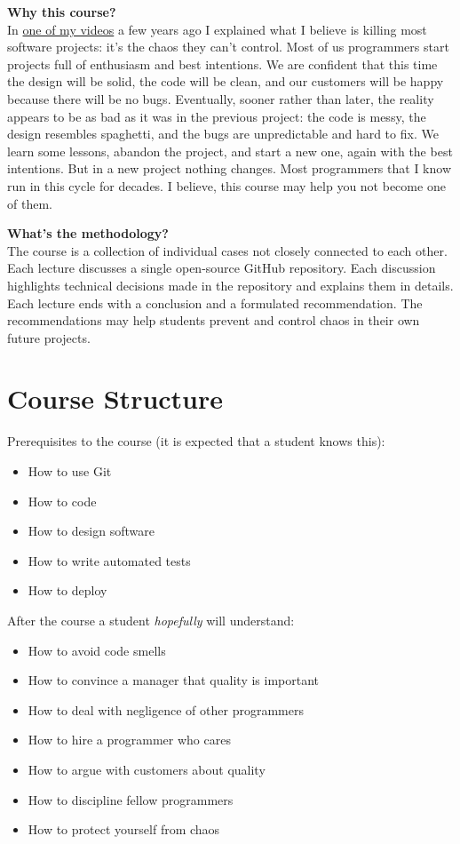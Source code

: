 \documentclass[nobrand,anonymous,nodate,nosecurity]{huawei}
\begin{document}
{\textbf{Why this course?}\\
In \href{https://www.youtube.com/watch?v=kPmbRkSWYnY}{one of my videos}
a few years ago I explained what I believe is killing
most software projects: it's the chaos they can't control. Most of us
programmers start projects full of enthusiasm and best intentions.
We are confident that this time the design will be solid, the code will
be clean, and our customers will be happy because there will be no bugs.
Eventually, sooner rather than later, the reality appears to be as bad
as it was in the previous project: the code is messy, the design resembles
spaghetti, and the bugs are unpredictable and hard to fix. We learn some
lessons, abandon the project, and start a new one, again with the best
intentions. But in a new project nothing changes.
Most programmers that I know run in this cycle for decades.
I believe, this course may help you not become one of them.

\textbf{What's the methodology?}\\
The course is a collection of individual cases not
closely connected to each other. Each lecture discusses a single open-source
GitHub repository. Each discussion highlights technical decisions made in the
repository and explains them in details. Each lecture ends with a conclusion
and a formulated recommendation. The recommendations may help students
prevent and control chaos in their own future projects.

\newpage
\section*{Course Structure}

Prerequisites to the course (it is expected that a student knows this):

\begin{itemize}
\item How to use Git
\item How to code
\item How to design software
\item How to write automated tests
\item How to deploy
\end{itemize}

After the course a student \emph{hopefully} will understand:

\begin{itemize}
\item How to avoid code smells
\item How to convince a manager that quality is important
\item How to deal with negligence of other programmers
\item How to hire a programmer who cares
\item How to argue with customers about quality
\item How to discipline fellow programmers
\item How to protect yourself from chaos
\end{itemize}

}
\end{document}

